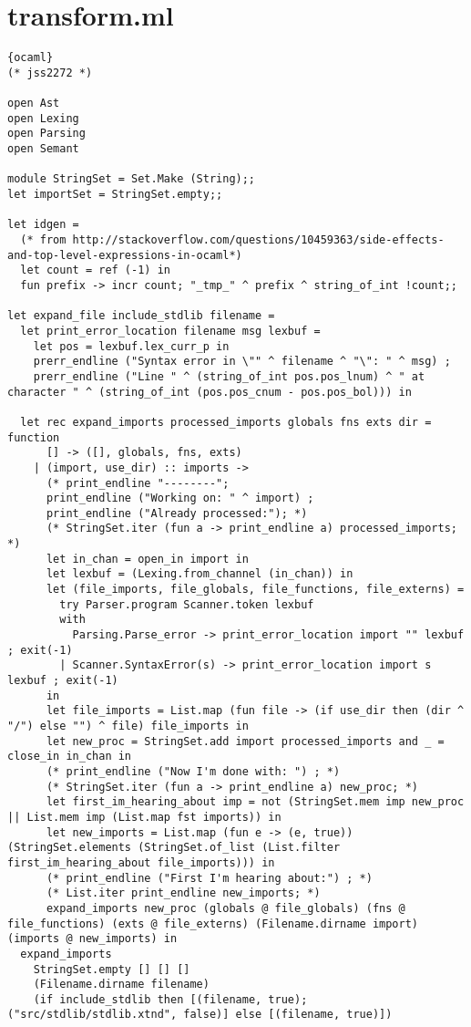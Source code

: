 \section{transform.ml}
\begin{lstlisting}{ocaml}
(* jss2272 *)

open Ast
open Lexing
open Parsing
open Semant

module StringSet = Set.Make (String);;
let importSet = StringSet.empty;;

let idgen =
  (* from http://stackoverflow.com/questions/10459363/side-effects-and-top-level-expressions-in-ocaml*)
  let count = ref (-1) in
  fun prefix -> incr count; "_tmp_" ^ prefix ^ string_of_int !count;;

let expand_file include_stdlib filename =
  let print_error_location filename msg lexbuf =
    let pos = lexbuf.lex_curr_p in
    prerr_endline ("Syntax error in \"" ^ filename ^ "\": " ^ msg) ;
    prerr_endline ("Line " ^ (string_of_int pos.pos_lnum) ^ " at character " ^ (string_of_int (pos.pos_cnum - pos.pos_bol))) in

  let rec expand_imports processed_imports globals fns exts dir = function
      [] -> ([], globals, fns, exts)
    | (import, use_dir) :: imports ->
      (* print_endline "--------";
      print_endline ("Working on: " ^ import) ;
      print_endline ("Already processed:"); *)
      (* StringSet.iter (fun a -> print_endline a) processed_imports; *)
      let in_chan = open_in import in
      let lexbuf = (Lexing.from_channel (in_chan)) in
      let (file_imports, file_globals, file_functions, file_externs) =
        try Parser.program Scanner.token lexbuf
        with
          Parsing.Parse_error -> print_error_location import "" lexbuf ; exit(-1)
        | Scanner.SyntaxError(s) -> print_error_location import s lexbuf ; exit(-1)
      in
      let file_imports = List.map (fun file -> (if use_dir then (dir ^ "/") else "") ^ file) file_imports in
      let new_proc = StringSet.add import processed_imports and _ = close_in in_chan in
      (* print_endline ("Now I'm done with: ") ; *)
      (* StringSet.iter (fun a -> print_endline a) new_proc; *)
      let first_im_hearing_about imp = not (StringSet.mem imp new_proc || List.mem imp (List.map fst imports)) in
      let new_imports = List.map (fun e -> (e, true)) (StringSet.elements (StringSet.of_list (List.filter first_im_hearing_about file_imports))) in
      (* print_endline ("First I'm hearing about:") ; *)
      (* List.iter print_endline new_imports; *)
      expand_imports new_proc (globals @ file_globals) (fns @ file_functions) (exts @ file_externs) (Filename.dirname import) (imports @ new_imports) in
  expand_imports
    StringSet.empty [] [] []
    (Filename.dirname filename)
    (if include_stdlib then [(filename, true); ("src/stdlib/stdlib.xtnd", false)] else [(filename, true)])


\end{lstlisting}
